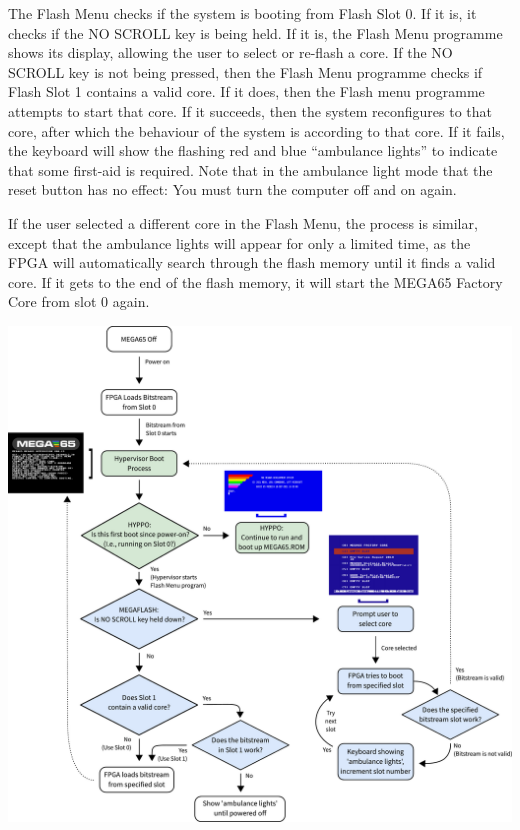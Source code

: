 The Flash Menu checks if the system is booting from Flash
Slot 0.  If it is, it checks if the NO SCROLL key is being held.  If
it is, the Flash Menu programme shows its display, allowing the user
to select or re-flash a core. If the NO SCROLL key is not being
pressed, then the Flash Menu programme checks if Flash Slot 1 contains a valid
core.  If it does, then the Flash menu programme attempts to start
that core.  If it succeeds, then the system reconfigures to that core,
after which the behaviour of the system is according to that core. If
it fails, the keyboard will show the flashing red and blue ``ambulance
lights'' to indicate that some first-aid is required.  Note that in
the ambulance light mode that the reset button has no effect: You must
turn the computer off and on again.

If the user selected a different core in the Flash Menu, the process
is similar, except that the ambulance lights will appear for only a
limited time, as the FPGA will automatically search through the flash
memory until it finds a valid core. If it gets to the end of the flash
memory, it will start the MEGA65 Factory Core from slot 0 again.

\includegraphics[width=\linewidth]{images/illustrations/flashmenu-flowchart.pdf}


